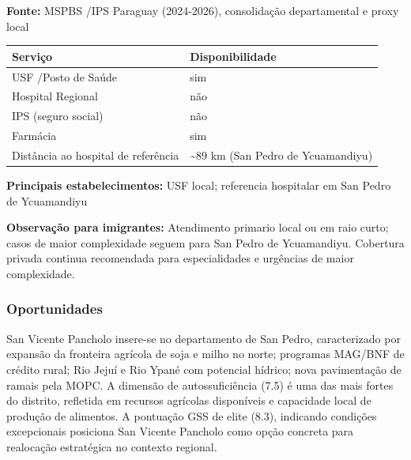 \textbf{Fonte:} MSPBS /\allowbreak  IPS Paraguay (2024-2026), consolidação
departamental e proxy local

{\def\LTcaptype{none} %
\begin{longtable}[]{@{}
  >{\raggedright\arraybackslash}p{}
  >{\raggedright\arraybackslash}p{}@{}}
\toprule\noalign{}
\begin{minipage}[b]{\linewidth}\raggedright
Serviço
\end{minipage} & \begin{minipage}[b]{\linewidth}\raggedright
Disponibilidade
\end{minipage} \\
\midrule\noalign{}
\endhead
\bottomrule\noalign{}
\endlastfoot
USF /\allowbreak  Posto de Saúde & sim \\
Hospital Regional & não \\
IPS (seguro social) & não \\
Farmácia & sim \\
Distância ao hospital de referência & \textasciitilde89 km (San Pedro de
Ycuamandiyu) \\
\end{longtable}
}

\textbf{Principais estabelecimentos:} USF local; referencia hospitalar
em San Pedro de Ycuamandiyu

\textbf{Observação para imigrantes:} Atendimento primario local ou em
raio curto; casos de maior complexidade seguem para San Pedro de
Ycuamandiyu. Cobertura privada continua recomendada para especialidades
e urgências de maior complexidade.
\newpage

\subsubsection*{Oportunidades}\label{oport-san-vicente-pancholo-0221}
San Vicente Pancholo insere-se no departamento de San Pedro, caracterizado por expansão da fronteira agrícola de soja e milho no norte; programas MAG/BNF de crédito rural; Rio Jejuí e Rio Ypané com potencial hídrico; nova pavimentação de ramais pela MOPC. A dimensão de autossuficiência (7.5) é uma das mais fortes do distrito, refletida em recursos agrícolas disponíveis e capacidade local de produção de alimentos. A pontuação GSS de elite (8.3), indicando condições excepcionais posiciona San Vicente Pancholo como opção concreta para realocação estratégica no contexto regional.

